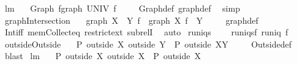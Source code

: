 \begin{isabellebody}
%
\endisadelimproof
\isanewline
\isanewline
{}\isamarkupfalse%
\ lm{}{}{}{\isacharcolon}\ \isanewline
\ \ {\isachardoublequoteopen}Graph\ f{\isacharequal}graph\ UNIV\ f{\isachardoublequoteclose}\ \isanewline
%
\isadelimproof
\ \ %
\endisadelimproof
%
\isatagproof
{}\isamarkupfalse%
\ Graph{\isacharunderscore}def\ graph{\isacharunderscore}def\ \isamarkupfalse%
\ simp%
\endisatagproof
{\isafoldproof}%
%
\isadelimproof
\isanewline
%
\endisadelimproof
\isanewline
{}\isamarkupfalse%
\ graphIntersection{\isacharcolon}\ \isanewline
\ \ {\isachardoublequoteopen}graph\ {\isacharparenleft}X\ {\isasyminter}\ Y{\isacharparenright}\ f\ {\isasymsubseteq}\ {\isacharparenleft}{\isacharparenleft}graph\ X\ f{\isacharparenright}\ {\isacharbar}{\isacharbar}\ Y{\isacharparenright}{\isachardoublequoteclose}\ \isanewline
%
\isadelimproof
\ \ %
\endisadelimproof
%
\isatagproof
{}\isamarkupfalse%
\ graph{\isacharunderscore}def\ \isanewline
\ \ \isamarkupfalse%
\ Int{\isacharunderscore}iff\ mem{\isacharunderscore}Collect{\isacharunderscore}eq\ restrict{\isacharunderscore}ext\ subrelI\ \isamarkupfalse%
\ auto%
\endisatagproof
{\isafoldproof}%
%
\isadelimproof
\isanewline
%
\endisadelimproof
\isanewline
{}\isamarkupfalse%
\ runiqs\ \isanewline
\ \ \ {\isachardoublequoteopen}runiqs{\isacharequal}{\isacharbraceleft}f{\isachardot}\ runiq\ f{\isacharbraceright}{\isachardoublequoteclose}\isanewline
\isanewline
{}\isamarkupfalse%
\ outsideOutside{\isacharcolon}\ \isanewline
\ \ {\isachardoublequoteopen}{\isacharparenleft}{\isacharparenleft}P\ outside\ X{\isacharparenright}\ outside\ Y{\isacharparenright}\ {\isacharequal}\ P\ outside\ {\isacharparenleft}X{\isasymunion}Y{\isacharparenright}{\isachardoublequoteclose}\ \isanewline
%
\isadelimproof
\ \ %
\endisadelimproof
%
\isatagproof
{}\isamarkupfalse%
\ Outside{\isacharunderscore}def\ \isamarkupfalse%
\ blast%
\endisatagproof
{\isafoldproof}%
%
\isadelimproof
\isanewline
%
\endisadelimproof
\isanewline
{}\isamarkupfalse%
\ lm{}{}{}{\isacharcolon}\ \isanewline
\ \ {\isachardoublequoteopen}{\isacharparenleft}{\isacharparenleft}P\ outside\ X{\isacharparenright}\ outside\ X{\isacharparenright}\ {\isacharequal}\ P\ outside\ X{\isachardoublequoteclose}\ \isanewline
%
\isadelimproof
\ \ %
\endisadelimproof
%
\isatagproof
{}\isamarkupfalse%

\end{isabellebody}
